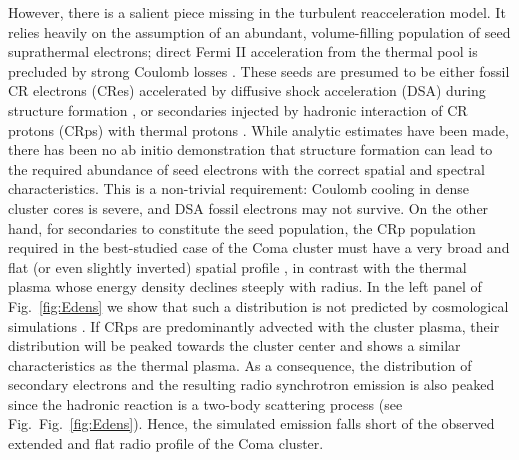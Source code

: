 \documentclass[a4paper,fleqn,usenatbib]{mnras}
\begin{document}
However, there is a salient piece missing in the turbulent
reacceleration model. It relies heavily on the assumption of an
abundant, volume-filling population of seed suprathermal electrons;
direct Fermi II acceleration from the thermal pool is precluded by
strong Coulomb losses
\citep{2008ApJ...682..175P,2012ApJ...759..113C}. These seeds are
presumed to be either fossil CR electrons (CRes) accelerated by
diffusive shock acceleration (DSA) during structure formation
\citep{1999ApJ...520..529S}, or secondaries injected by hadronic
interaction of CR protons (CRps) with thermal protons
\citep{brunetti11}. While analytic estimates have been made, there has
been no ab initio demonstration that structure formation can lead to
the required abundance of seed electrons with the correct spatial and
spectral characteristics. This is a non-trivial requirement: Coulomb
cooling in dense cluster cores is severe, and DSA fossil electrons may
not survive. On the other hand, for secondaries to constitute the seed
population, the CRp population required in the best-studied case of
the Coma cluster must have a very broad and flat (or even slightly
inverted) spatial profile \citep{brunetti12}, in contrast with the
thermal plasma whose energy density declines steeply with radius. In
the left panel of Fig.~\ref{fig:Edens} we show that such a
distribution is not predicted by cosmological simulations \cite[see
  also][]{pinzke10,2014MNRAS.439.2662V}. If CRps are predominantly
advected with the cluster plasma, their distribution will be peaked
towards the cluster center and shows a similar characteristics as the
thermal plasma. As a consequence, the distribution of secondary
electrons and the resulting radio synchrotron emission is also peaked
since the hadronic reaction is a two-body scattering process (see
Fig.~Fig.~\ref{fig:Edens}). Hence, the simulated emission falls short
of the observed extended and flat radio profile of the Coma cluster.
\end{document}
